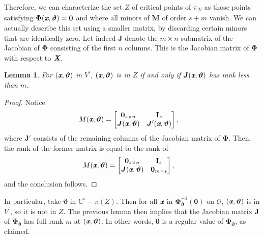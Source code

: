 \documentclass[a4paper]{article}
\def\sO{\mathscr{O}}
\def\Xb{\textit{\textbf{X}}}
\def\thetab{\bm{\vartheta}}
\def\xb{\textit{\textbf{x}}}
\def\dt{s}
\def\C{\mathbb{C}}
\def\bbm{\begin{bmatrix}}
\def\ebm{\end{bmatrix}}
\newtheorem{lemma}[theorem]{Lemma}
\begin{document}
    Therefore, we can characterize the set $Z$ of critical points of
    $\pi_{|V}$ as those points satisfying $\bm\Phi(\xb,\thetab)=\bm 0$ and
    where all minors of $\bm M$ of order $\dt+m$ vanish. We can actually
    describe this set using a smaller matrix, by discarding certain minors
    that are identically zero. Let indeed $\bm J$ denote the $m \times n$
    submatrix of the Jacobian of $\bm\Phi$ consisting of the first $n$
    columns. This is the Jacobian matrix of $\bm \Phi$ with respect to $\Xb$.
    \begin{lemma} 
      For $(\xb,\thetab)$ in $V^{'}$, $(\xb,\thetab)$ is in $Z$ if and only if
      $\bm J(\xb,\thetab)$ has rank less than $m$.
    \end{lemma}
    \begin{proof}
    Notice 
    \begin{align*}
    M(\xb,\thetab)&= 
    \bbm 
    \textbf{0}_{\dt \times n} &\textbf{I}_{\dt} \\
    \bm J(\xb,\thetab)     &\bm J'(\xb,\thetab)
    \ebm,
    \end{align*}
    where $\bm J'$ consists of the remaining columns of the Jacobian matrix of
    $\bm\Phi$.  Then, the rank of the former matrix is equal to the rank
    of
    \begin{align*}
    M(\xb,\thetab)&= 
    \bbm 
    \textbf{0}_{\dt \times n} &\textbf{I}_{\dt} \\
    \bm J(\xb,\thetab)     & \bm 0_{m \times s}
    \ebm,
    \end{align*}
    and the conclusion follows.
    \end{proof}
\noindent
    In particular, take $\thetab$ in $\C^\dt - \overline{\pi(Z)}$.
    Then for all $\xb$ in $\bm \Phi_{\thetab}^{-1}(\bm 0)$ on $\sO$, $(\xb,\thetab)$
    is in $V^{'}$, so it is not in $Z$. The previous lemma then implies that
    the Jacobian matrix $\bm J$ of $\bm\Phi_{\thetab}$ has full rank $m$ at
    $(\xb,\thetab)$. In other words, $\bm 0$ is a regular value of $\bm
    \Phi_{\thetab}$, as claimed.
    
    
    
\end{document}
